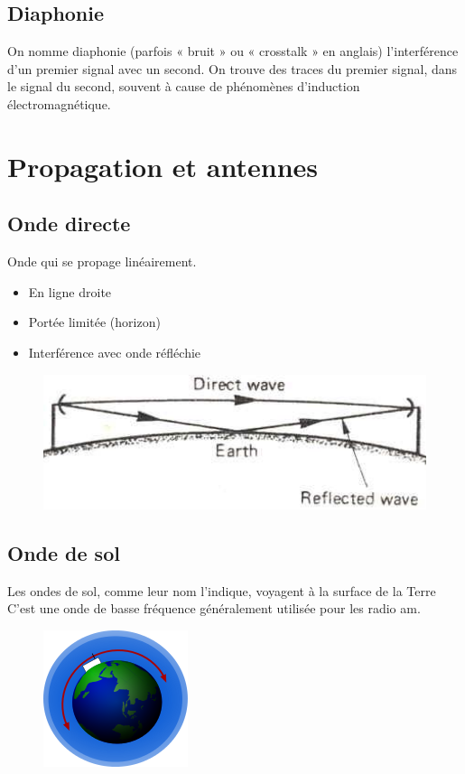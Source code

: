 \documentclass[12pt]{article}
\begin{document}
\subsection{Diaphonie}

On nomme diaphonie (parfois « bruit » ou « crosstalk » en anglais) l'interférence d'un premier signal avec un second. On trouve des traces du premier signal, dans le signal du second, souvent à cause de phénomènes d'induction électromagnétique.

\newpage

\section{Propagation et antennes}

\subsection{Onde directe}

Onde qui se propage linéairement.
\begin{itemize}
\item En ligne droite
\item Portée limitée (horizon)
\item Interférence avec onde réfléchie
\end{itemize}

\begin{figure}[H]
\centering
\includegraphics[scale=0.5]{images/OndeDirecte.png}
\end{figure}

\subsection{Onde de sol}

Les ondes de sol, comme leur nom l’indique, voyagent à la surface de la Terre C'est une onde de basse fréquence généralement utilisée pour les radio am.

\begin{figure}[H]
\centering
\includegraphics[scale=0.8]{images/OndeDeSol.png}
\end{figure}
\end{document}
